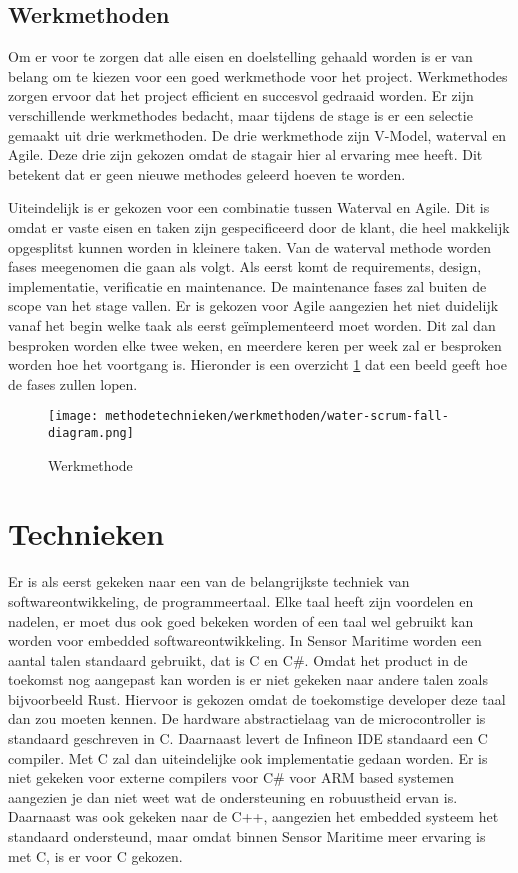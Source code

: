 \subsection{Werkmethoden}
Om er voor te zorgen dat alle eisen en doelstelling gehaald worden is er van belang om te kiezen voor een goed werkmethode voor het project. Werkmethodes zorgen ervoor dat het project efficient en succesvol gedraaid worden. Er zijn verschillende werkmethodes bedacht, maar tijdens de stage is er een selectie gemaakt uit drie werkmethoden. De drie werkmethode zijn V-Model, waterval en Agile. Deze drie zijn gekozen omdat de stagair hier al ervaring mee heeft. Dit betekent dat er geen nieuwe methodes geleerd hoeven te worden. \newline

\noindent Uiteindelijk is er gekozen voor een combinatie tussen Waterval en Agile. Dit is omdat er vaste eisen en taken zijn gespecificeerd door de klant, die heel makkelijk opgesplitst kunnen worden in kleinere taken. Van de waterval methode worden fases meegenomen die gaan als volgt. Als eerst komt de requirements, design, implementatie, verificatie en maintenance. De maintenance fases zal buiten de scope van het stage vallen. Er is gekozen voor Agile aangezien het niet duidelijk vanaf het begin welke taak als eerst geïmplementeerd moet worden. Dit zal dan besproken worden elke twee weken, en meerdere keren per week zal er besproken worden hoe het voortgang is. Hieronder is een overzicht \ref{fig:agilewaterval} dat een beeld geeft hoe de fases zullen lopen.

\begin{figure}[h!]
	\centering
	\caption{Werkmethode}
	\label{fig:agilewaterval}
	\texttt{[image: methodetechnieken/werkmethoden/water-scrum-fall-diagram.png]}
\end{figure}


\section{Technieken}
Er is als eerst gekeken naar een van de belangrijkste techniek van softwareontwikkeling, de programmeertaal. Elke taal heeft zijn voordelen en nadelen, er moet dus ook goed bekeken worden of een taal wel gebruikt kan worden voor embedded softwareontwikkeling. In Sensor Maritime worden een aantal talen standaard gebruikt, dat is C en C\#. Omdat het product in de toekomst nog aangepast kan worden is er niet gekeken naar andere talen zoals bijvoorbeeld Rust. Hiervoor is gekozen omdat de toekomstige developer deze taal dan zou moeten kennen. De hardware abstractielaag van de microcontroller is standaard geschreven in C. Daarnaast levert de Infineon IDE standaard een C compiler. Met C zal dan uiteindelijke ook implementatie gedaan worden. Er is niet gekeken voor externe compilers voor C\# voor ARM based systemen aangezien je dan niet weet wat de ondersteuning en robuustheid ervan is. Daarnaast was ook gekeken naar de C++, aangezien het embedded systeem het standaard ondersteund, maar omdat binnen Sensor Maritime meer ervaring is met C, is er voor C gekozen. 

